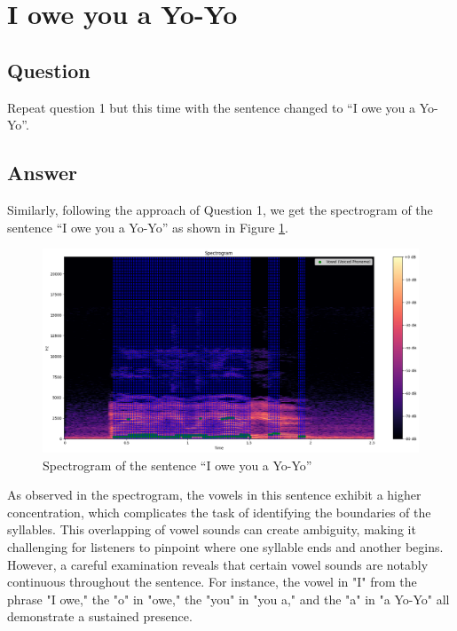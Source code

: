 
\section{I owe you a Yo-Yo}

\subsection{Question}
Repeat question 1 but this time with the sentence changed to “I owe you a Yo-Yo”.

\subsection{Answer}
Similarly, following the approach of Question 1, we get the spectrogram of the sentence “I owe you a Yo-Yo” as shown in Figure \ref{fig:Question2}.

\begin{figure}[H]
    \centering
    \includegraphics[width=\textwidth]{./img/Q2-1.png}
    \caption{Spectrogram of the sentence “I owe you a Yo-Yo”}
    \label{fig:Question2}
\end{figure}

As observed in the spectrogram, the vowels in this sentence exhibit a higher concentration, which complicates the task of identifying the boundaries of the syllables. This overlapping of vowel sounds can create ambiguity, making it challenging for listeners to pinpoint where one syllable ends and another begins. However, a careful examination reveals that certain vowel sounds are notably continuous throughout the sentence. For instance, the vowel in "I" from the phrase "I owe," the "o" in "owe," the "you" in "you a," and the "a" in "a Yo-Yo" all demonstrate a sustained presence.

